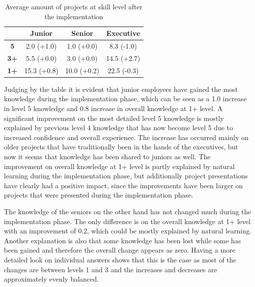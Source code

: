 \begin{table}[H]
	\begin{center}
		\begin{tabular}{|c|c|c|c|}
			\hline
            	 		& \textbf{Junior} & \textbf{Senior} & \textbf{Executive} \\ \hline
			\textbf{5}  & 2.0 (+1.0)     & 1.0 (+0.0)      & 8.3 (-1.0)          \\ \hline
			\textbf{3+} & 5.5 (+0.0)     & 3.0 (+0.0)      & 14.5 (+2.7)         \\ \hline
			\textbf{1+} & 15.3 (+0.8)    & 10.0 (+0.2)     & 22.5 (-0.3)         \\ \hline
		\end{tabular}
		
		\caption{Average amount of projects at skill level after the implementation}
		\label{table:projects-per-level-after}
	\end{center}
\end{table}

Judging by the table it is evident that junior employees have gained the most knowledge during the implementation phase, which can be seen as a 1.0 increase in level 5 knowledge and 0.8 increase in overall
knowledge at 1+ level. A significant improvement on the most detailed level 5 knowledge is mostly explained by previous level 4 knowledge that has now become level 5 due to increased confidence and overall
experience. The increase has occurred mainly on older projects that have traditionally been in the hands of the executives, but now it seems that knowledge has been shared to juniors as well.
The improvement on overall knowledge at 1+ level is partly explained by natural learning during the implementation phase, but additionally project presentations have clearly had a positive impact, since
the improvements have been larger on projects that were presented during the implementation phase.

The knowledge of the seniors on the other hand has not changed much during the implementation phase. The only difference is on the overall knowledge at 1+ level with an improvement of 0.2, which could be mostly
explained by natural learning. Another explanation is also that some knowledge has been lost while some has been gained and therefore the overall change appears as zero. Having a more detailed look on individual
answers shows that this is the case as most of the changes are between levels 1 and 3 and the increases and decreases are approximately evenly balanced.

